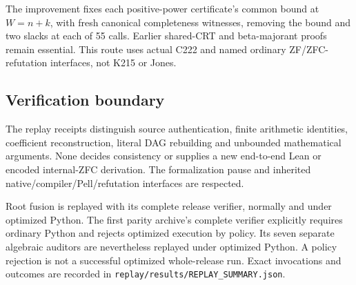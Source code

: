 The improvement fixes each positive-power certificate's common bound
at $W=n+k$, with fresh canonical completeness witnesses, removing the
bound and two slacks at each of 55 calls.  Earlier shared-CRT and
beta-majorant proofs remain essential.  This route uses actual C222
and named ordinary ZF/ZFC-refutation interfaces, not K215 or Jones.

\subsection{Verification boundary}
The replay receipts distinguish source authentication, finite arithmetic
identities, coefficient reconstruction, literal DAG rebuilding and
unbounded mathematical arguments.  None decides consistency or supplies
a new end-to-end Lean or encoded internal-ZFC derivation.  The
formalization pause and inherited native/compiler/Pell/refutation
interfaces are respected.

Root fusion is replayed with its complete release verifier, normally
and under optimized Python.  The first parity archive's complete
verifier explicitly requires ordinary Python and rejects optimized
execution by policy.  Its seven separate algebraic auditors are
nevertheless replayed under optimized Python.  A policy rejection
is not a successful optimized whole-release run.  Exact invocations
and outcomes are recorded in
\texttt{replay/results/REPLAY\_SUMMARY.json}.
